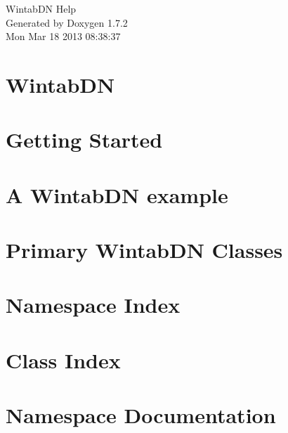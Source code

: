\documentclass[a4paper]{book}
\begin{document}
\hypersetup{pageanchor=false}
\begin{titlepage}
\vspace*{7cm}
\begin{center}
{\Large WintabDN Help }\\
\vspace*{1cm}
{\large Generated by Doxygen 1.7.2}\\
\vspace*{0.5cm}
{\small Mon Mar 18 2013 08:38:37}\\
\end{center}
\end{titlepage}
\clearemptydoublepage
{}
\tableofcontents
\clearemptydoublepage
{}
\hypersetup{pageanchor=true}
\chapter{WintabDN}
\label{index}\hypertarget{index}{}
\chapter{Getting Started}
\label{page1}
\hypertarget{page1}{}

\chapter{A WintabDN example}
\label{page2}
\hypertarget{page2}{}

\chapter{Primary WintabDN Classes}
\label{page3}
\hypertarget{page3}{}

\chapter{Namespace Index}

\chapter{Class Index}

\chapter{Namespace Documentation}

\end{document}

